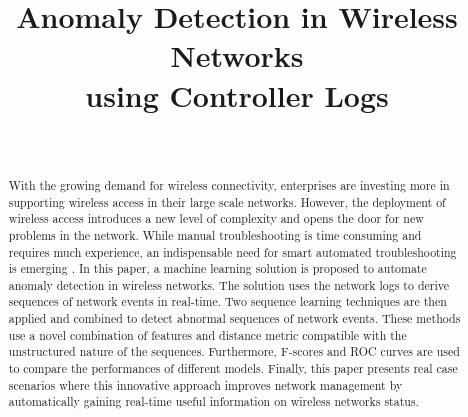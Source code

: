 \documentclass[conference]{IEEEtran}
\begin{document}
\title{Anomaly Detection in Wireless Networks \\using Controller Logs}


\author{
    \\
}

\maketitle

\begin{abstract}
With the growing demand for wireless connectivity, enterprises are investing more in supporting wireless access in their large scale networks. However, the deployment of wireless access introduces a new level of complexity and opens the door for new problems in the network. While manual troubleshooting is time consuming and requires much experience, an indispensable need for smart automated troubleshooting is emerging . In this paper, a machine learning solution is proposed to automate anomaly detection in wireless networks. The solution uses the network logs to derive sequences of network events in real-time. Two sequence learning techniques are then applied and combined to detect abnormal sequences of network events. These methods use a novel combination of features and distance metric compatible with the unstructured nature of the sequences. Furthermore, F-scores and ROC curves are used to compare the performances of different models. Finally, this paper presents real case scenarios where this innovative approach improves network management by automatically gaining real-time useful information on wireless networks status.

\end{abstract}

\end{document}
